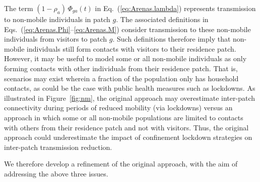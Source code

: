 \begin{enumerate}
  The term $(1-\rho_a)\,\Phi_{ga}(t)$ in Eq.~(\ref{eq:Arenas.lambda})
  represents transmission to non-mobile individuals in patch $g$.
  The associated definitions in Eqs.~(\ref{eq:Arenas.Phi}--\ref{eq:Arenas.M})
  consider transmission to these non-mobile individuals from visitors to patch $g$.
  Such definitions therefore imply that
  non-mobile individuals still form contacts with visitors to their residence patch.
  However, it may be useful to model some or all non-mobile individuals
  as only forming contacts with other individuals from their residence patch.
  That is, scenarios may exist wherein a fraction of the population only has
  household contacts, as could be the case with public health measures such as lockdowns.
  As illustrated in Figure~\ref{fig:nm}, the original approach may
  overestimate inter-patch connectivity during periods of reduced mobility (via lockdowns)
  versus an approach in which some or all non-mobile populations are limited to
  contacts with others from their residence patch and not with visitors.
  Thus, the original approach \cite{Arenas2020} could underestimate
  the impact of confinement lockdown strategies on inter-patch transmission reduction.
\end{enumerate}
We therefore develop a refinement of the original approach,
with the aim of addressing the above three issues.
